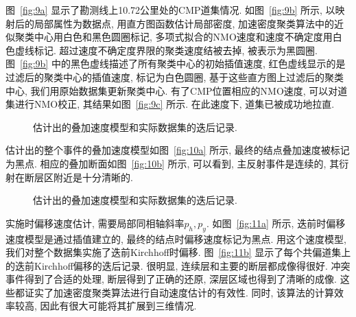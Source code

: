 图~\ref{fig:9a} 显示了勘测线上10.72公里处的CMP道集情况. 如图~\ref{fig:9b} 所示, 以映射后的局部属性为数据点, 用直方图函数估计局部密度, 加速密度聚类算法中的近似聚类中心用白色和黑色圆圈标记, 多项式拟合的NMO速度和速度不确定度用白色虚线标记. 超过速度不确定度界限的聚类速度结被去掉, 被表示为黑圆圈. 图~\ref{fig:9b} 中的黑色虚线描述了所有聚类中心的初始插值速度, 红色虚线显示的是过滤后的聚类中心的插值速度, 标记为白色圆圈, 基于这些直方图上过滤后的聚类中心, 我们用原始数据集更新聚类中心. 有了CMP位置相应的NMO速度, 可以对道集进行NMO校正, 其结果如图~\ref{fig:9c} 所示. 在此速度下, 道集已被成功地拉直. 
\begin{figure}[htb]
    \centering
    \caption{估计出的叠加速度模型和实际数据集的迭后记录. \label{fig:10}}
\end{figure}
估计出的整个事件的叠加速度模型如图~\ref{fig:10a} 所示, 最终的结点叠加速度被标记为黑点. 相应的叠加断面如图~\ref{fig:10b} 所示, 可以看到, 主反射事件是连续的, 其衍射在断层区附近是十分清晰的. 
\begin{figure}[htb]
    \centering
    \caption{估计出的叠加速度模型和实际数据集的迭后记录. \label{fig:11}}
\end{figure}

实施时偏移速度估计, 需要局部同相轴斜率$p_h, p_y$. 如图~\ref{fig:11a} 所示, 迭前时偏移速度模型是通过插值建立的, 最终的结点时偏移速度标记为黑点. 用这个速度模型, 我们对整个数据集实施了迭前Kirchhoff时偏移. 图~\ref{fig:11b} 显示了每个共偏道集上的迭前Kirchhoff偏移的迭后记录. 很明显, 连续层和主要的断层都成像得很好. 冲突事件得到了合适的处理, 断层得到了正确的还原, 深层区域也得到了清晰的成像. 这些都证实了加速密度聚类算法进行自动速度估计的有效性. 同时, 该算法的计算效率较高, 因此有很大可能将其扩展到三维情况. 


